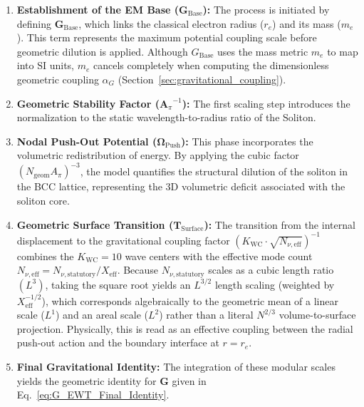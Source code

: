 \documentclass[10pt,a4paper]{article}
\begin{document}
\begin{enumerate}[label=\textbf{Step \arabic*:}]
	\item \textbf{Establishment of the EM Base (\(\mathbf{G}_{\text{Base}}\)):}
	The process is initiated by defining \(\mathbf{G}_{\text{Base}}\), which links the classical electron radius (\(r_e\)) and its mass (\(m_e\)). This term represents the maximum potential coupling scale before geometric dilution is applied. Although \(G_{\text{Base}}\) uses the mass metric \(m_e\) to map into SI units, \(m_e\) cancels completely when computing the dimensionless geometric coupling \(\alpha_G\) (Section~\ref{sec:gravitational_coupling}).
	
	\item \textbf{Geometric Stability Factor (\({\mathbf{A}_{\pi}}^{-1}\)):}
	The first scaling step introduces the normalization to the static wavelength-to-radius ratio of the Soliton.
	
	\item \textbf{Nodal Push-Out Potential (\(\mathbf{\Omega}_{\text{Push}}\)):}
	This phase incorporates the volumetric redistribution of energy. By applying the cubic factor \((N_{\text{geom}} A_\pi)^{-3}\), the model quantifies the structural dilution of the soliton in the BCC lattice, representing the 3D volumetric deficit associated with the soliton core.
	
	\item \textbf{Geometric Surface Transition (\(\mathbf{T}_{\text{Surface}}\)):}
	The transition from the internal displacement to the gravitational coupling factor \((K_{\mathrm{WC}} \cdot \sqrt{N_{\nu,\text{eff}}})^{-1}\) combines the \(K_{\mathrm{WC}}=10\) wave centers with the effective mode count \(N_{\nu,\text{eff}} = N_{\nu,\text{statutory}} / X_{\text{eff}}\). Because \(N_{\nu,\text{statutory}}\) scales as a cubic length ratio \((L^3)\), taking the square root yields an \(L^{3/2}\) length scaling (weighted by \(X_{\text{eff}}^{-1/2}\)), which corresponds algebraically to the geometric mean of a linear scale (\(L^1\)) and an areal scale (\(L^2\)) rather than a literal \(N^{2/3}\) volume-to-surface projection. Physically, this is read as an effective coupling between the radial push-out action and the boundary interface at \(r=r_e\).
	
	\item \textbf{Final Gravitational Identity:}
	The integration of these modular scales yields the geometric identity for \(\mathbf{G}\) given in Eq.~\eqref{eq:G_EWT_Final_Identity}.
\end{enumerate}
\end{document}
